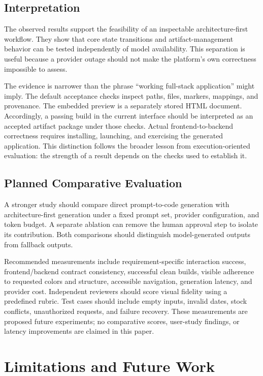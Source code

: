 \documentclass[conference,a4paper]{IEEEtran}
\begin{document}
\subsection{Interpretation}
The observed results support the feasibility of an inspectable architecture-first workflow. They show that core state transitions and artifact-management behavior can be tested independently of model availability. This separation is useful because a provider outage should not make the platform's own correctness impossible to assess.

The evidence is narrower than the phrase ``working full-stack application'' might imply. The default acceptance checks inspect paths, files, markers, mappings, and provenance. The embedded preview is a separately stored HTML document. Accordingly, a passing build in the current interface should be interpreted as an accepted artifact package under those checks. Actual frontend-to-backend correctness requires installing, launching, and exercising the generated application. This distinction follows the broader lesson from execution-oriented evaluation: the strength of a result depends on the checks used to establish it.

\subsection{Planned Comparative Evaluation}
A stronger study should compare direct prompt-to-code generation with architecture-first generation under a fixed prompt set, provider configuration, and token budget. A separate ablation can remove the human approval step to isolate its contribution. Both comparisons should distinguish model-generated outputs from fallback outputs.

Recommended measurements include requirement-specific interaction success, frontend/backend contract consistency, successful clean builds, visible adherence to requested colors and structure, accessible navigation, generation latency, and provider cost. Independent reviewers should score visual fidelity using a predefined rubric. Test cases should include empty inputs, invalid dates, stock conflicts, unauthorized requests, and failure recovery. These measurements are proposed future experiments; no comparative scores, user-study findings, or latency improvements are claimed in this paper.

\section{Limitations and Future Work}
\end{document}

